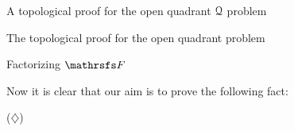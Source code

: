 \documentclass[11pt, a4paper, english, twoside, notitlepage, openright]{report}
\begin{document}
\begin{chapter}{A topological proof for the open quadrant $\mathcal{Q}$ problem}
\begin{section}{The topological proof for the open quadrant problem}
\begin{subsection}{Factorizing $\FFF$}

Now it is clear that our aim is to prove the following fact:

\begin{center}
 ($\diamondsuit$)
\end{center}


\end{subsection}
\end{section}
\end{chapter}
\end{document}
